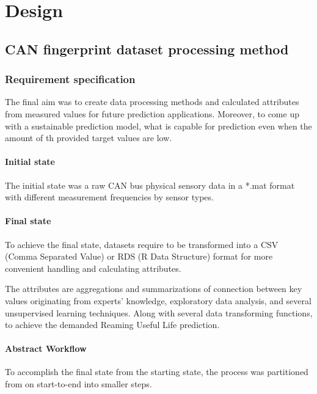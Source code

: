\chapter{Design}
\section{CAN fingerprint dataset processing method}
\subsection{Requirement specification}
	\noindent
The final aim was to create data processing methods and calculated attributes from measured values for future prediction applications. Moreover, to come up with a sustainable prediction model, what is capable for prediction even when the amount of th provided target values are low.
	\subsubsection{Initial state}
The initial state was a raw CAN bus physical sensory data in a *.mat format with different measurement frequencies by sensor types.
	\subsubsection{Final state}
To achieve the final state, datasets require to be transformed into a CSV (Comma Separated Value) or RDS (R Data Structure) format for more convenient handling and calculating attributes.

The attributes are aggregations and summarizations of connection between key values originating from experts' knowledge, exploratory data analysis, and several unsupervised learning techniques. Along with several data transforming functions, to achieve the demanded Reaming Useful Life prediction.
\clearpage
\subsubsection{Abstract Workflow}
To accomplish the final state from the starting state, the process was partitioned from on start-to-end into smaller steps. 

